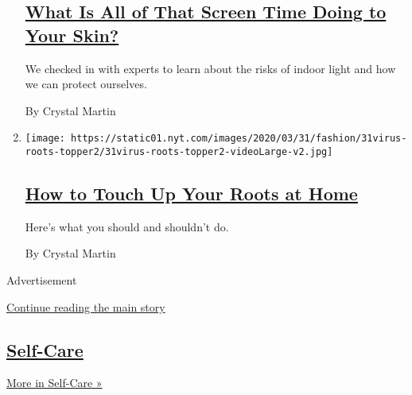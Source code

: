 \begin{enumerate}
  \hypertarget{what-is-all-of-that-screen-time-doing-to-your-skin}{%
  \subsection{\texorpdfstring{\href{/2020/05/20/style/skin-damage-blue-light-what-is-all-of-that-screen-time-doing-to-your-skin.html}{What
  Is All of That Screen Time Doing to Your
  Skin?}}{What Is All of That Screen Time Doing to Your Skin?}}\label{what-is-all-of-that-screen-time-doing-to-your-skin}}

  We checked in with experts to learn about the risks of indoor light
  and how we can protect ourselves.

  By Crystal Martin
\item
  \texttt{[image: https://static01.nyt.com/images/2020/03/31/fashion/31virus-roots-topper2/31virus-roots-topper2-videoLarge-v2.jpg]}

  \hypertarget{how-to-touch-up-your-roots-at-home}{%
  \subsection{\texorpdfstring{\href{/2020/03/31/style/how-to-touch-up-your-roots-at-home.html}{How
  to Touch Up Your Roots at
  Home}}{How to Touch Up Your Roots at Home}}\label{how-to-touch-up-your-roots-at-home}}

  Here's what you should and shouldn't do.

  By Crystal Martin
\end{enumerate}

Advertisement

\protect\hyperlink{after-mid3}{Continue reading the main story}

\hypertarget{self-care}{%
\subsection{\texorpdfstring{\href{/section/style/self-care}{Self-Care}}{Self-Care}}\label{self-care}}

\href{/section/style/self-care}{More in Self-Care »}

